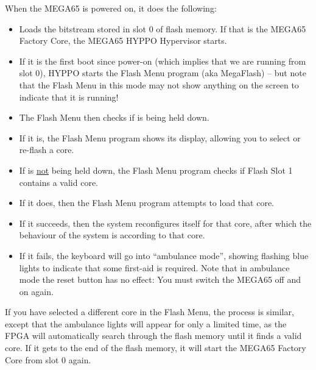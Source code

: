 When the MEGA65 is powered on, it does the following:
\begin{itemize}
\item Loads the bitstream stored in slot 0 of flash memory. If that is the MEGA65 Factory Core, the MEGA65 
  HYPPO Hypervisor starts.
\item If it is the first boot since power-on (which implies that we are running from slot 0), HYPPO starts the Flash Menu program (aka MegaFlash) -- but note that the Flash Menu in
      this mode may not show anything on the screen to indicate that it is running!
\item The Flash Menu then checks if  is being held down.
\item If it is, the Flash Menu program shows its display, allowing you to select or re-flash a core.
\item If  is \underline{not} being held down, the Flash Menu program checks if Flash Slot 1 contains a valid
      core.
\item If it does, then the Flash Menu program attempts to load that core.
\item If it succeeds, then the system reconfigures itself for that core, after which the behaviour of the system is
      according to that core.
\item If it fails, the keyboard will go into ``ambulance mode'', showing flashing blue lights to indicate that some
      first-aid is required. Note that in ambulance mode the reset button has no effect: You must switch the
      MEGA65 off and on again.
\end{itemize}



If you have selected a different core in the Flash Menu, the process
is similar, except that the ambulance lights will appear for only a
limited time, as the FPGA will automatically search through the flash
memory until it finds a valid core. If it gets to the end of the flash
memory, it will start the MEGA65 Factory Core from slot 0 again.




